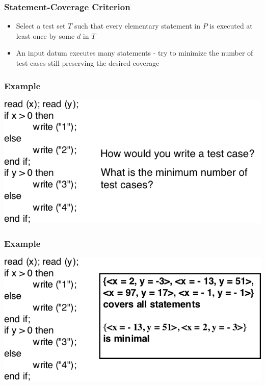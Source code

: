 \documentclass[t,12pt,numbers,fleqn]{beamer}
\begin{document}

\begin{frame}
\frametitle{Statement-Coverage Criterion}

\begin{itemize}
\item Select a test set $T$ such that every elementary statement in $P$ is
  executed at least once by some $d$ in $T$
\item An input datum executes many statements - try to minimize the number of
  test cases still preserving the desired coverage
\end{itemize}

\end{frame}


\begin{frame}
\frametitle{Example}

\includegraphics[scale=0.5]{../Figures/ExampleStatementCoverageOnlyCode.png}

\end{frame}


\begin{frame}
\frametitle{Example}

\includegraphics[scale=0.5]{../Figures/ExampleStatementCoverage.png}

\end{frame}
\end{document}

